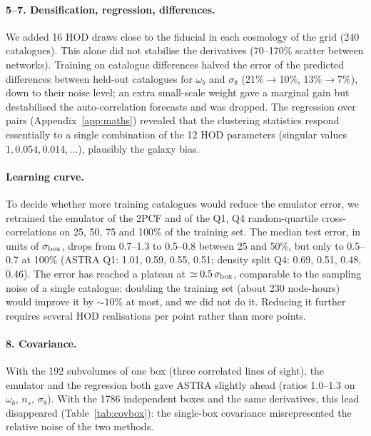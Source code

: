 \documentclass[11pt,twocolumn]{article}
\begin{document}
\paragraph{5--7. Densification, regression, differences.} We added 16 HOD draws close to the fiducial in each cosmology of the grid (240 catalogues). This alone did not stabilise the derivatives (70--170\% scatter between networks). Training on catalogue differences halved the error of the predicted differences between held-out catalogues for $\omega_b$ and $\sigma_8$ (21\%$\to$10\%, 13\%$\to$7\%), down to their noise level; an extra small-scale weight gave a marginal gain but destabilised the auto-correlation forecasts and was dropped. The regression over pairs (Appendix~\ref{app:maths}) revealed that the clustering statistics respond essentially to a single combination of the 12 HOD parameters (singular values $1, 0.054, 0.014,\dots$), plausibly the galaxy bias.

\paragraph{Learning curve.} To decide whether more training catalogues would reduce the emulator error, we retrained the emulator of the 2PCF and of the Q1, Q4 random-quartile cross-correlations on 25, 50, 75 and 100\% of the training set. The median test error, in units of $\sigma_{\rm box}$, drops from 0.7--1.3 to 0.5--0.8 between 25 and 50\%, but only to 0.5--0.7 at 100\% (ASTRA Q1: 1.01, 0.59, 0.55, 0.51; density split Q4: 0.69, 0.51, 0.48, 0.46). The error has reached a plateau at $\simeq0.5\,\sigma_{\rm box}$, comparable to the sampling noise of a single catalogue: doubling the training set (about 230 node-hours) would improve it by $\sim10\%$ at most, and we did not do it. Reducing it further requires several HOD realisations per point rather than more points.

\paragraph{8. Covariance.} With the 192 subvolumes of one box (three correlated lines of sight), the emulator and the regression both gave ASTRA slightly ahead (ratios 1.0--1.3 on $\omega_b$, $n_s$, $\sigma_8$). With the 1786 independent boxes and the same derivatives, this lead disappeared (Table~\ref{tab:covbox}): the single-box covariance misrepresented the relative noise of the two methods.
\end{document}
